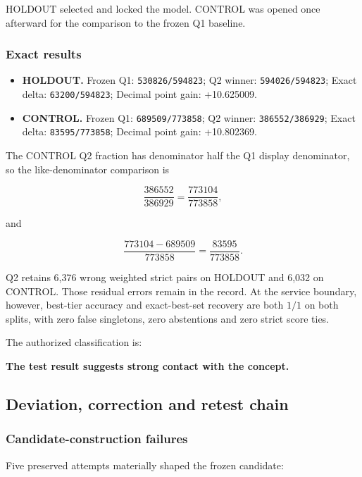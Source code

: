 HOLDOUT selected and locked the model. CONTROL was opened once afterward
for the comparison to the frozen Q1 baseline.

\subsubsection{Exact results}\label{viii-ch07-exact-results}

\begin{itemize}
\tightlist
\item
  \textbf{HOLDOUT.} Frozen Q1: \texttt{530826/594823}; Q2 winner:
  \texttt{594026/594823}; Exact delta: \texttt{63200/594823}; Decimal
  point gain: +10.625009.
\item
  \textbf{CONTROL.} Frozen Q1: \texttt{689509/773858}; Q2 winner:
  \texttt{386552/386929}; Exact delta: \texttt{83595/773858}; Decimal
  point gain: +10.802369.
\end{itemize}

The CONTROL Q2 fraction has denominator half the Q1 display denominator,
so the like-denominator comparison is

\[
\frac{386552}{386929}
=\frac{773104}{773858},
\]

and

\[
\frac{773104-689509}{773858}
=\frac{83595}{773858}.
\]

Q2 retains 6,376 wrong weighted strict pairs on HOLDOUT and 6,032 on
CONTROL. Those residual errors remain in the record. At the service
boundary, however, best-tier accuracy and exact-best-set recovery are
both \(1/1\) on both splits, with zero false singletons, zero
abstentions and zero strict score ties.

The authorized classification is:

\textbf{The test result suggests strong contact with the concept.}

\subsection{Deviation, correction and retest
chain}\label{viii-ch07-deviation-correction-and-retest-chain}

\subsubsection{Candidate-construction
failures}\label{viii-ch07-candidate-construction-failures}

Five preserved attempts materially shaped the frozen candidate:

